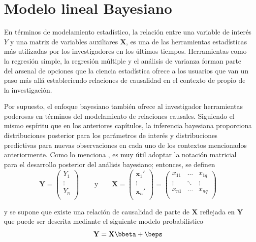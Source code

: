 
 
\chapter{Modelo lineal Bayesiano}

En términos de modelamiento estadístico, la relación entre una variable de interés $Y$ y una matriz de variables auxiliares $\mathbf{X}$, es una de las herramientas estadísticas más utilizadas por los investigadores en los últimos tiempos. Herramientas como la regresión simple, la regresión múltiple y el análisis de varianza forman parte del arsenal de opciones que la ciencia estadística ofrece a los usuarios que van un paso más allá estableciendo relaciones de causalidad en el contexto de propio de la investigación.

Por supuesto, el enfoque bayesiano también ofrece al investigador herramientas poderosas en términos del modelamiento de relaciones causales. Siguiendo el mismo espíritu que en los anteriores capítulos, la inferencia bayesiana proporciona distribuciones posterior para los parámetros de interés y distribuciones predictivas para nuevas observaciones en cada uno de los contextos mencionados anteriormente. Como lo menciona , es muy útil adoptar la notación matricial para el desarrollo posterior del análisis bayesiano; entonces, se definen
\begin{equation*}
\mathbf{Y}=
\begin{pmatrix}
  Y_1 \\
  \vdots \\
  Y_n \\
\end{pmatrix} \ \ \ \ \ \ \ \ \ \ \text{y} \ \ \ \ \ \ \ \ \
\textbf{X}=
\begin{pmatrix}
  \mathbf{x}_1' \\
  \vdots \\
  \mathbf{x}_n' \\
\end{pmatrix}
=
\begin{pmatrix}
  x_{11} & \ldots & x_{1q} \\
  \vdots & \ddots & \vdots \\
  x_{n1} & \ldots & x_{nq} \\
\end{pmatrix}
\end{equation*}

y se supone que existe una relación de causalidad de parte de $\mathbf{X}$ reflejada en $\mathbf{Y}$ que puede ser descrita mediante el siguiente modelo probabilístico
\begin{equation}
\mathbf{Y}=\mathbf{X}\bbeta+\beps
\end{equation}

